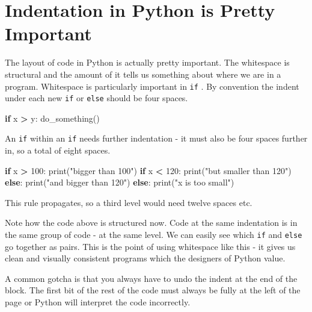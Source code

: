 \documentclass[]{book}
\newenvironment{Shaded}{\begin{snugshade}}{\end{snugshade}}
\newcommand{\BuiltInTok}[1]{#1}
\newcommand{\ControlFlowTok}[1]{\textcolor[rgb]{0.13,0.29,0.53}{\textbf{#1}}}
\newcommand{\DecValTok}[1]{\textcolor[rgb]{0.00,0.00,0.81}{#1}}
\newcommand{\NormalTok}[1]{#1}
\newcommand{\OperatorTok}[1]{\textcolor[rgb]{0.81,0.36,0.00}{\textbf{#1}}}
\newcommand{\StringTok}[1]{\textcolor[rgb]{0.31,0.60,0.02}{#1}}
\theoremstyle{definition}
\theoremstyle{definition}
\theoremstyle{definition}
\theoremstyle{remark}
\begin{document}
\hypertarget{indentation-in-python-is-pretty-important}{%
\section{Indentation in Python is Pretty
Important}\label{indentation-in-python-is-pretty-important}}

The layout of code in Python is actually pretty important. The
whitespace is structural and the amount of it tells us something about
where we are in a program. Whitespace is particularly important in
\texttt{if} . By convention the indent under each new \texttt{if} or
\texttt{else} should be four spaces.

\begin{Shaded}
\begin{Highlighting}[]
\ControlFlowTok{if}\NormalTok{ x }\OperatorTok{>}\NormalTok{ y:}
\NormalTok{    do_something()}
\end{Highlighting}
\end{Shaded}

An \texttt{if} within an \texttt{if} needs further indentation - it must
also be four spaces further in, so a total of eight spaces.

\begin{Shaded}
\begin{Highlighting}[]
\ControlFlowTok{if}\NormalTok{ x }\OperatorTok{>} \DecValTok{100}\NormalTok{:}
    \BuiltInTok{print}\NormalTok{(}\StringTok{"bigger than 100"}\NormalTok{)}
    \ControlFlowTok{if}\NormalTok{ x  }\OperatorTok{<} \DecValTok{120}\NormalTok{:}
        \BuiltInTok{print}\NormalTok{(}\StringTok{"but smaller than 120"}\NormalTok{)}
    \ControlFlowTok{else}\NormalTok{:}
        \BuiltInTok{print}\NormalTok{(}\StringTok{"and bigger than 120"}\NormalTok{)}
\ControlFlowTok{else}\NormalTok{:}
    \BuiltInTok{print}\NormalTok{(}\StringTok{"x is too small"}\NormalTok{)}
\end{Highlighting}
\end{Shaded}

This rule propagates, so a third level would need twelve spaces etc.

Note how the code above is structured now. Code at the same indentation
is in the same group of code - at the same level. We can easily see
which \texttt{if} and \texttt{else} go together as pairs. This is the
point of using whitespace like this - it gives us clean and visually
consistent programs which the designers of Python value.

A common gotcha is that you always have to undo the indent at the end of
the block. The first bit of the rest of the code must always be fully at
the left of the page or Python will interpret the code incorrectly.
\end{document}
